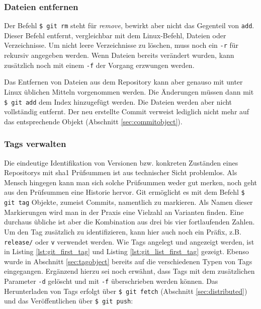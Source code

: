 
\subsubsection{Dateien entfernen}
Der Befehl \texttt{\$ git rm} steht für \textit{remove}, bewirkt aber nicht das
Gegenteil von \texttt{add}. Dieser Befehl entfernt, vergleichbar mit dem
Linux-Befehl, Dateien oder Verzeichnisse. Um nicht leere Verzeichnisse zu
löschen, muss noch ein \texttt{-r} für rekursiv angegeben werden. Wenn Dateien
bereits verändert wurden, kann zusätzlich noch mit einem \texttt{-f} der
Vorgang erzwungen werden.


Das Entfernen von Dateien aus dem Repository kann aber genauso mit unter Linux
üblichen Mitteln vorgenommen werden. Die Änderungen müssen dann mit \texttt{\$
git add} dem Index hinzugefügt werden. Die Dateien werden aber nicht
vollständig entfernt. Der neu erstellte Commit verweist lediglich nicht mehr
auf das entsprechende Objekt (Abschnitt \ref{sec:commitobject}).
\cite[S.~43-44]{gitosp}

\subsubsection{Tags verwalten}\label{sec:managetags}
Die eindeutige Identifikation von Versionen bzw. konkreten Zuständen eines
Repositorys mit \gls{sha1} Prüfsummen ist aus technischer Sicht problemlos.
Als Mensch hingegen kann man sich solche Prüfsummen weder gut merken, noch geht
aus den Prüfsummen eine Historie hervor. Git ermöglicht es mit dem Befehl
\texttt{\$ git tag} Objekte, zumeist Commits, namentlich zu markieren. Als
Namen dieser Markierungen wird man in der Praxis eine Vielzahl an Varianten
finden. Eine durchaus übliche ist aber die Kombination aus drei bis vier
fortlaufenden Zahlen. Um den Tag zusätzlich zu identifizieren, kann hier auch
noch ein Präfix, z.B. \texttt{release/} oder \texttt{v} verwendet werden. Wie
Tags angelegt und angezeigt werden, ist in Listing \ref{lst:git_first_tag} und
Listing \ref{lst:git_list_first_tag} gezeigt.  Ebenso wurde in Abschnitt
\ref{sec:tagobject} bereits auf die verschiedenen Typen von Tags eingegangen.
Ergänzend hierzu sei noch erwähnt, dass Tags mit dem zusätzlichen Parameter
\texttt{-d} gelöscht und mit \texttt{-f} überschrieben werden können. Das
Herunterladen von Tags erfolgt über \texttt{\$ git fetch} (Abschnitt
\ref{sec:distributed}) und das Veröffentlichen über \texttt{\$ git push}:

